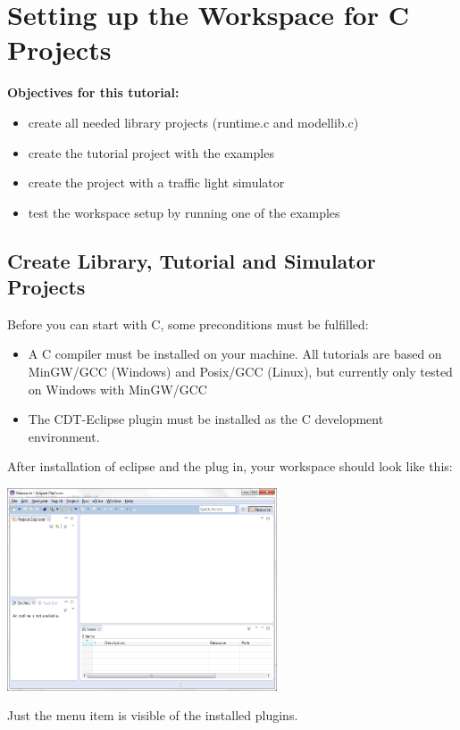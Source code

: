 \section{Setting up the Workspace for C Projects}

\textbf{Objectives for this tutorial:}
\begin{itemize}
	\item create all needed library projects (runtime.c and modellib.c)
	\item create the tutorial project with the examples
	\item create the project with a traffic light simulator
	\item test the workspace setup by running one of the examples
\end{itemize}

\subsection{Create Library, Tutorial and Simulator Projects}

Before you can start with C, some preconditions must be fulfilled:

\begin{itemize}
\item A C compiler must be installed on your machine. All tutorials are based on MinGW/GCC (Windows) and Posix/GCC (Linux), but currently only tested on Windows with MinGW/GCC
\item The CDT-Eclipse plugin must be installed as the C development environment.
\end{itemize}

After installation of eclipse and the \eTrice{} plug in, your workspace should look like this:  

\includegraphics[width=0.6\textwidth]{images/013-SetupWorkspace01.png}

Just the \eTrice{} menu item is visible of the installed \eTrice{} plugins.


